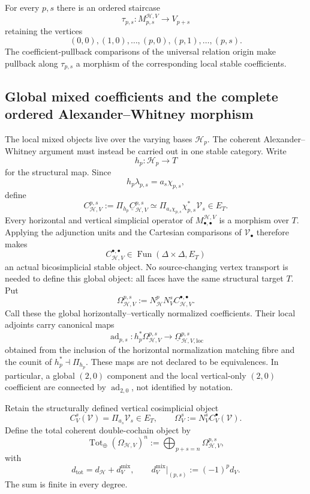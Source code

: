 For every $p,s$ there is an ordered staircase
\[
\tau_{p,s}:M^{\mathcal H,V}_{p,s}\longrightarrow V_{p+s}
\]
retaining the vertices
\[
(0,0),(1,0),\ldots,(p,0),(p,1),\ldots,(p,s).
\]
The coefficient-pullback comparisons of the universal relation origin make
pullback along $\tau_{p,s}$ a morphism of the corresponding local stable
coefficients.

\subsection{Global mixed coefficients and the complete ordered Alexander--Whitney morphism}
\label{subsec:prequantum-ordered-contraction-cartan-homotopy}

The local mixed objects live over the varying bases $\mathcal H_p$.  The
coherent Alexander--Whitney argument must instead be carried out in one stable
category.  Write
\[
h_p:\mathcal H_p\longrightarrow T
\]
for the structural map.  Since
\[
h_p\lambda_{p,s}=a_s\chi_{p,s},
\]
define
\[
\boxed{
C_{\mathcal H,V}^{p,s}
:=
\Pi_{h_p}\underline C_{\mathcal H,V}^{p,s}
\simeq
\Pi_{a_s\chi_{p,s}}\chi_{p,s}^*\mathcal V_s
\in E_T.
}
\]
Every horizontal and vertical simplicial operator of
$M^{\mathcal H,V}_{\bullet,\bullet}$ is a morphism over $T$.  Applying the
adjunction units and the Cartesian comparisons of $\mathcal V_\bullet$ therefore
makes
\[
C_{\mathcal H,V}^{\bullet,\bullet}
\in
\operatorname{Fun}(\Delta\times\Delta,E_T)
\]
an actual bicosimplicial stable object.  No source-changing vertex transport is
needed to define this global object: all faces have the same structural target
$T$.  Put
\[
\Omega_{\mathcal H,V}^{p,s}
:=
N_{\mathcal H}^{p}N_V^{s}
C_{\mathcal H,V}^{\bullet,\bullet}.
\]
Call these the global horizontally--vertically normalized coefficients.  Their
local adjoints carry canonical maps
\[
\operatorname{ad}_{p,s}:
h_p^*\Omega_{\mathcal H,V}^{p,s}
\longrightarrow
\underline\Omega^{p,s}_{\mathcal H,V,\mathrm{loc}}
\]
obtained from the inclusion of the horizontal normalization matching fibre and
the counit of $h_p^*\dashv\Pi_{h_p}$.  These maps are not declared to be
equivalences.  In particular, a global $(2,0)$ component and the local
vertical-only $(2,0)$ coefficient are connected by $\operatorname{ad}_{2,0}$,
not identified by notation.

Retain the structurally defined vertical cosimplicial object
\[
C_V^s(\mathcal V)=\Pi_{a_s}\mathcal V_s\in E_T,
\qquad
\Omega_V^s:=N_V^sC_V^\bullet(\mathcal V).
\]
Define the total coherent double-cochain object by
\[
\operatorname{Tot}_{\oplus}(\Omega_{\mathcal H,V})^n
:=
\bigoplus_{p+s=n}\Omega_{\mathcal H,V}^{p,s},
\]
with
\[
d_{\mathrm{tot}}=d_{\mathcal H}+d_V^{\mathrm{mix}},
\qquad
 d_V^{\mathrm{mix}}|_{(p,s)}:=(-1)^p d_V.
\]
The sum is finite in every degree.

